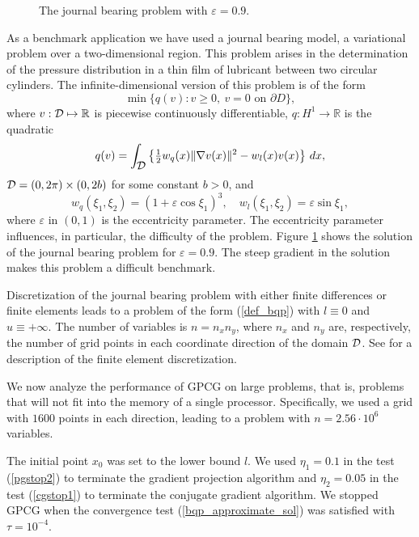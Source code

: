 \documentclass{esub2acm}
\newcommand{\Ref}[1]{\mbox{\rm{(\ref{#1})}}}
\newcommand{\half}{{\textstyle{\frac{1}{2}}}}
\newcommand{\grad}{\nabla}
\newcommand{\R}{\mbox{${\mathbb R}$}}
\newcommand{\cD} {\mbox{$\cal D$}}
\begin{document}
\begin{figure} 
\centerline{}
\caption{The journal bearing problem with $ \varepsilon = 0.9 $.\label{pjb}}
\end{figure}

As a benchmark application we have used a journal bearing model,
a variational problem over a two-dimensional region.
This problem arises in the determination of the
pressure distribution in a thin film of lubricant
between two circular cylinders.
The infinite-dimensional version of this problem is
of the form
\[
\min \{ q ( v ) : v \ge 0 , \ v = 0 \mbox{ on } \partial D \} ,
\]
where $ v : \cD \mapsto \R $ is piecewise continuously differentiable,
$ q : H^1 \to \R $ is the quadratic 
\[
q (v) =
 \int_{ \cD } \left \{ \half  w_q (x) \| \grad v (x) \| ^ 2  -
  w_l (x) v (x) \right \} \, d x , 
\]
$ \cD = ( 0 , 2 \pi ) \times ( 0 , 2b ) $ for some constant $ b > 0 $,
and
\[
 w_q ( \xi_1 , \xi_2 ) = ( 1 + \varepsilon \cos \xi_1 ) ^ 3 , \quad
 w_l ( \xi_1 , \xi_2 ) = \varepsilon \sin \xi_1 ,
\]
where $ \varepsilon $ in $ (0,1) $ is the eccentricity parameter.
The eccentricity parameter
influences, in particular, the difficulty of the problem.
Figure \ref{pjb} shows the solution of the journal bearing problem
for $ \varepsilon = 0.9 $. The steep gradient in the solution
makes this problem a difficult benchmark.

Discretization of the journal bearing problem with either finite differences or
finite elements leads to a problem of the form \Ref{def_bqp} with
$ l \equiv 0 $ and $ u \equiv + \infty $.
The number of variables is $ n = n_x n_y $, where
$ n_x $ and $ n_y $ are, respectively, the number of
grid points in each coordinate direction of the domain $ \cD $.
See  for a description of the
finite element discretization.

We now analyze the performance of GPCG on large problems,
that is, problems that will not fit into the memory of a
single processor. Specifically,
we used a grid with 
$1600$ points in each direction, leading to a problem with
$ n = 2.56 \cdot 10^6 $ variables.

The initial point $ x_0 $ was set to the lower bound $l$.
We used $\eta_1  = 0.1$ in the test \Ref{pgstop2} to terminate the gradient
projection algorithm and $\eta_2=0.05$ in the test
\Ref{cgstop1} to terminate the conjugate gradient algorithm.
We stopped GPCG when the convergence test 
\Ref{bqp_approximate_sol} was satisfied with $ \tau = 10^{-4} $.
\end{document}
